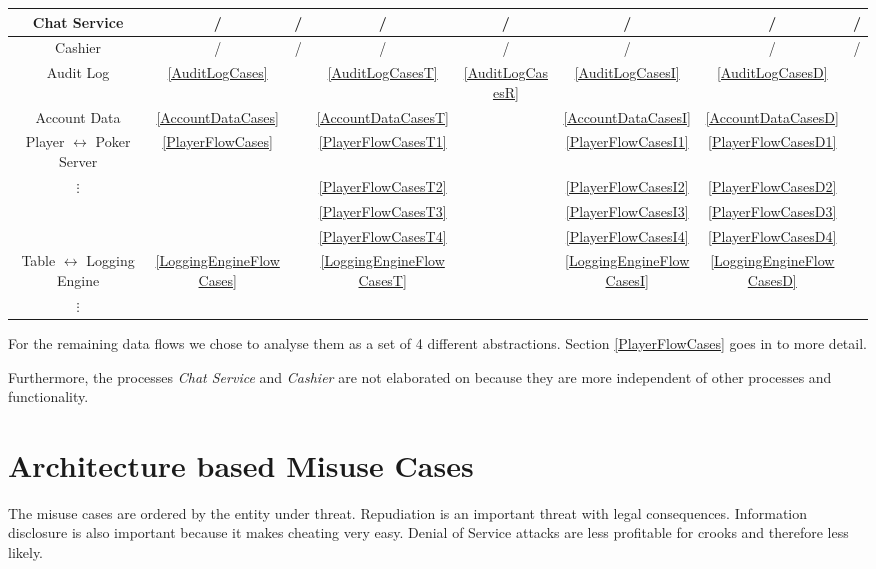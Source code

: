 \documentclass[a4paper,11pt]{report}
\begin{document}
\begin{center}
\begin{tabular}{| c || c || c | c | c | c | c | c |}
  Chat Service 		& /			& / 	& /	& / 	& / 	& / 	& /	\\\hline
  Cashier 		& /			& / 	& /	& / 	& / 	& / 	& /	\\\hline
  \hline
  Audit Log 		& \ref{AuditLogCases}		& 	& \ref{AuditLogCasesT}	& \ref{AuditLogCasesR} 	& \ref{AuditLogCasesI} 	& \ref{AuditLogCasesD}	& 	\\\hline
  Account Data 		& \ref{AccountDataCases}	& 	& \ref{AccountDataCasesT}	&  	& \ref{AccountDataCasesI} 	& \ref{AccountDataCasesD}	& 	\\\hline
  \hline
  Player $\leftrightarrow$ 
  Poker Server 		& \ref{PlayerFlowCases}		&	& \ref{PlayerFlowCasesT1}	&	& \ref{PlayerFlowCasesI1}	& \ref{PlayerFlowCasesD1}	&\\
  $\vdots$		& 				&	& \ref{PlayerFlowCasesT2}	&	& \ref{PlayerFlowCasesI2}	& \ref{PlayerFlowCasesD2}	&	\\
  			&				&	& \ref{PlayerFlowCasesT3}	&	& \ref{PlayerFlowCasesI3}	& \ref{PlayerFlowCasesD3}	\\
  			&				&	& \ref{PlayerFlowCasesT4}	&	& \ref{PlayerFlowCasesI4}	& \ref{PlayerFlowCasesD4}	\\\hline
  Table $\leftrightarrow$ 
  Logging Engine 	& \ref{LoggingEngineFlowCases}	&	& \ref{LoggingEngineFlowCasesT}	&	& \ref{LoggingEngineFlowCasesI}	& \ref{LoggingEngineFlowCasesD}	&	\\
  $\vdots$		& 				&	& 	&	& 	& 	&	\\\hline
\end{tabular}\end{center}
\vspace{0.3cm}

For the remaining data flows we chose to analyse them as a set of 4 different abstractions. Section \ref{PlayerFlowCases} goes in to more detail.

Furthermore, the processes \textit{Chat Service} and \textit{Cashier} are not elaborated on because they are more independent of other processes and functionality.

\section{Architecture based Misuse Cases}
\label{MisUseCases}

The misuse cases are ordered by the entity under threat. Repudiation is an important threat with legal consequences. Information disclosure is also important because it makes cheating very easy. Denial of Service attacks are less profitable for crooks and therefore less likely.
\end{document}
